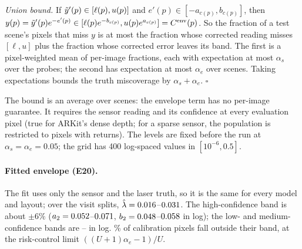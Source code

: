 \documentclass[10pt,twocolumn,letterpaper]{article}
\begin{document}
\emph{Union bound.} If $\tilde{y}'(p)\in[\ell(p),u(p)]$ and $e'(p)\in[-a_{c(p)},b_{c(p)}]$, then $y(p)=\tilde{y}'(p)e^{-e'(p)}\in[\ell(p)e^{-b_{c(p)}},u(p)e^{a_{c(p)}}]=C^{\text{env}}(p)$.
So the fraction of a test scene's pixels that miss $y$ is at most the fraction whose corrected reading misses $[\ell,u]$ plus the fraction whose corrected error leaves its band. The first is a pixel-weighted mean of per-image fractions, each with expectation at most $\alpha_s$ over the probes; the second has expectation at most $\alpha_e$ over scenes. Taking expectations bounds the truth miscoverage by $\alpha_s+\alpha_e$. \hfill$\square$

\noindent The bound is an average over scenes: the envelope term has no per-image guarantee. It requires the sensor reading and its confidence at every evaluation pixel (true for ARKit's dense depth; for a sparse sensor, the population is restricted to pixels with returns). The levels are fixed before the run at $\alpha_s=\alpha_e=0.05$; the grid has 400 log-spaced values in $[10^{-6},0.5]$.

\paragraph{Fitted envelope (E20).} The fit uses only the sensor and the laser truth, so it is the same for every model and layout; over the \NumEnvSplits{} visit splits, $\hat\lambda=0.016$--$0.031$. The high-confidence band is about $\pm6\%$ ($a_2=0.052$--$0.071$, $b_2=0.048$--$0.058$ in log); the low- and medium-confidence bands are \NumEnvLowMedLo--\NumEnvLowMedHi{} in log. \NumEnvCalLossLo\% of calibration pixels fall outside their band, at the risk-control limit $((U+1)\alpha_e-1)/U$.
\end{document}
